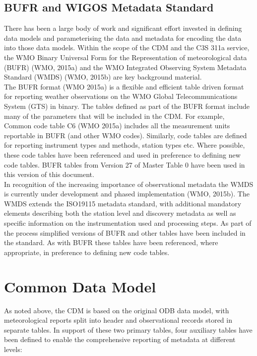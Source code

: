 \documentclass[a4paper,11pt]{article}
\begin{document}


\subsection {BUFR and WIGOS Metadata Standard}
There has been a large body of work and significant effort invested in defining data models and parameterising the data and metadata for encoding the data into those data models.  Within the scope of the CDM and the C3S 311a service, the WMO Binary Universal Form for the Representation of meteorological data (BUFR) (WMO, 2015a) and the WMO Integrated Observing System Metadata Standard (WMDS) (WMO, 2015b) are key background material. \\

The BUFR format (WMO 2015a) is a flexible and efficient table driven format for reporting weather observations on the WMO Global Telecommunications System (GTS) in binary. The tables defined as part of the BUFR format include many of the parameters that will be included in the CDM. For example, Common code table C6 (WMO 2015a) includes all the measurement units reportable in BUFR (and other WMO codes). Similarly, code tables are defined for reporting instrument types and methods, station types etc. Where possible, these code tables have been referenced and used in preference to defining new code tables.  BUFR tables from Version 27 of Master Table 0 have been used in this version of this document.\\

In recognition of the increasing importance of observational metadata the WMDS is currently under development and phased implementation (WMO, 2015b). The WMDS extends the ISO19115 metadata standard, with additional mandatory elements describing both the station level and discovery metadata as well as specific information on the instrumentation used and processing steps. As part of the process simplified versions of BUFR and other tables have been included in the standard. As with BUFR these tables have been referenced, where appropriate, in preference to defining new code tables.

\section {Common Data Model}
As noted above, the CDM is based on the original ODB data model, with meteorological reports split into header and observational records stored in separate tables. In support of these two primary tables, four auxiliary tables have been defined to enable the comprehensive reporting of metadata at different levels:\\
\end{document}
